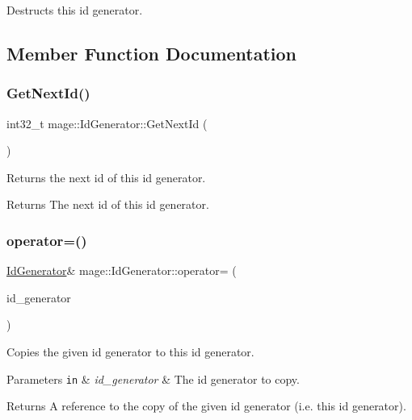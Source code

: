 Destructs this id generator. 

\subsection{Member Function Documentation}
\hypertarget{structmage_1_1_id_generator_a5125f4a4e928ae9bfcf71efce3789aa8}{}\label{structmage_1_1_id_generator_a5125f4a4e928ae9bfcf71efce3789aa8} 
\subsubsection{\texorpdfstring{Get\+Next\+Id()}{GetNextId()}}
{\footnotesize\ttfamily int32\+\_\+t mage\+::\+Id\+Generator\+::\+Get\+Next\+Id (\begin{DoxyParamCaption}{ }\end{DoxyParamCaption})\hspace{0.3cm}{\ttfamily [noexcept]}}

Returns the next id of this id generator.

\begin{DoxyReturn}{Returns}
The next id of this id generator. 
\end{DoxyReturn}
\hypertarget{structmage_1_1_id_generator_a370c8289f38a534006e8b9ca7ec78026}{}\label{structmage_1_1_id_generator_a370c8289f38a534006e8b9ca7ec78026} 
\subsubsection{\texorpdfstring{operator=()}{operator=()}\hspace{0.1cm}{\footnotesize\ttfamily [1/2]}}
{\footnotesize\ttfamily \hyperlink{structmage_1_1_id_generator}{Id\+Generator}\& mage\+::\+Id\+Generator\+::operator= (\begin{DoxyParamCaption}\item[{const \hyperlink{structmage_1_1_id_generator}{Id\+Generator} \&}]{id\+\_\+generator }\end{DoxyParamCaption})\hspace{0.3cm}{\ttfamily [delete]}}

Copies the given id generator to this id generator.


\begin{DoxyParams}[1]{Parameters}
\mbox{\tt in}  & {\em id\+\_\+generator} & The id generator to copy. \\
\hline
\end{DoxyParams}
\begin{DoxyReturn}{Returns}
A reference to the copy of the given id generator (i.\+e. this id generator). 
\end{DoxyReturn}
\hypertarget{structmage_1_1_id_generator_aace8082947445d26d2421ba8b361f1bc}{}\label{structmage_1_1_id_generator_aace8082947445d26d2421ba8b361f1bc} 

